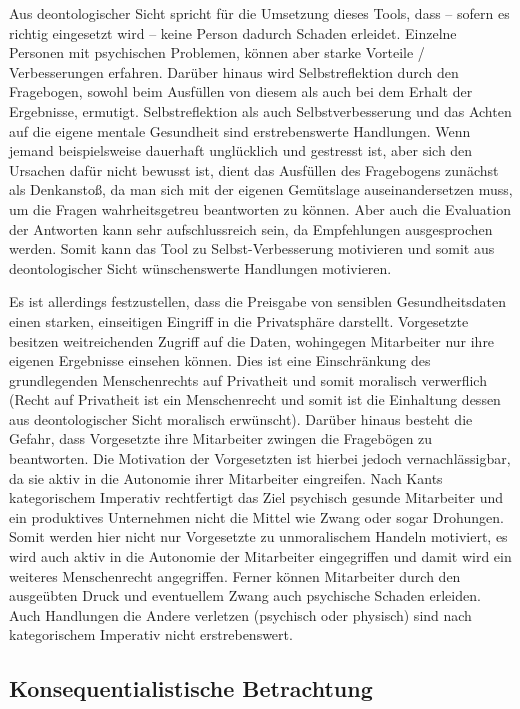 \documentclass[a4paper,12pt,]{article}
\begin{document}
Aus deontologischer Sicht spricht für die Umsetzung dieses Tools, dass – sofern es richtig eingesetzt wird – keine Person dadurch Schaden erleidet. Einzelne Personen mit psychischen Problemen, können aber starke Vorteile / Verbesserungen erfahren.
Darüber hinaus wird Selbstreflektion durch den Fragebogen, sowohl beim Ausfüllen von diesem als auch bei dem Erhalt der Ergebnisse, ermutigt. Selbstreflektion als auch Selbstverbesserung und das Achten auf die eigene mentale Gesundheit sind erstrebenswerte Handlungen. Wenn jemand beispielsweise dauerhaft unglücklich und gestresst ist, aber sich den Ursachen dafür nicht bewusst ist, dient das Ausfüllen des Fragebogens zunächst als Denkanstoß, da man sich mit der eigenen Gemütslage auseinandersetzen muss, um die Fragen wahrheitsgetreu beantworten zu können. Aber auch die Evaluation der Antworten kann sehr aufschlussreich sein, da Empfehlungen ausgesprochen werden. Somit kann das Tool zu Selbst-Verbesserung motivieren und somit aus deontologischer Sicht wünschenswerte Handlungen motivieren.

Es ist allerdings festzustellen, dass die Preisgabe von sensiblen Gesundheitsdaten einen starken, einseitigen Eingriff in die Privatsphäre darstellt. Vorgesetzte besitzen weitreichenden Zugriff auf die Daten, wohingegen Mitarbeiter nur ihre eigenen Ergebnisse einsehen können. Dies ist eine Einschränkung des grundlegenden Menschenrechts auf Privatheit und somit moralisch verwerflich (Recht auf Privatheit ist ein Menschenrecht und somit ist die Einhaltung dessen aus deontologischer Sicht moralisch erwünscht).
Darüber hinaus besteht die Gefahr, dass Vorgesetzte ihre Mitarbeiter zwingen die Fragebögen zu beantworten. Die Motivation der Vorgesetzten ist hierbei jedoch vernachlässigbar, da sie aktiv in die Autonomie ihrer Mitarbeiter eingreifen. Nach Kants kategorischem Imperativ rechtfertigt das Ziel psychisch gesunde Mitarbeiter und ein produktives Unternehmen nicht die Mittel wie Zwang oder sogar Drohungen. Somit werden hier nicht nur Vorgesetzte zu unmoralischem Handeln motiviert, es wird auch aktiv in die Autonomie der Mitarbeiter eingegriffen und damit wird ein weiteres Menschenrecht angegriffen. Ferner können Mitarbeiter durch den ausgeübten Druck und eventuellem Zwang auch psychische Schaden erleiden. Auch Handlungen die Andere verletzen (psychisch oder physisch) sind nach kategorischem Imperativ nicht erstrebenswert.


\subsection{Konsequentialistische Betrachtung}
\end{document}

